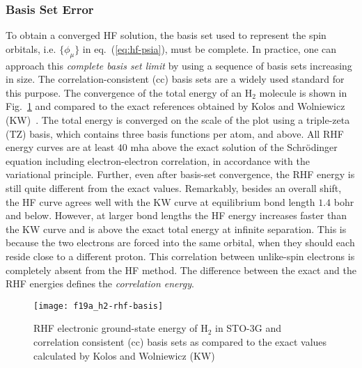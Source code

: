 \subsubsection{Basis Set Error}

To obtain a converged HF solution, the basis set used to represent the spin orbitals, i.e. $\{\phi_\mu\}$ in eq.~(\ref{eq:hf-psia}), must be complete.
In practice, one can approach this \textit{complete basis set limit} by using a sequence of basis sets increasing in size.
The correlation-consistent (cc) basis sets are a widely used standard for this purpose.
The convergence of the total energy of an H$_2$ molecule is shown in Fig.~\ref{fig:hf-h2} and compared to the exact references obtained by Kolos and Wolniewicz (KW)~\cite{Kolos1964}.
The total energy is converged on the scale of the plot using a triple-zeta (TZ) basis, which contains three basis functions per atom, and above.
All RHF energy curves are at least $40$ mha above the exact solution of the Schr\"odinger equation including electron-electron correlation, in accordance with the variational principle.
Further, even after basis-set convergence, the RHF energy is still quite different from the exact values.
Remarkably, besides an overall shift, the HF curve agrees well with the KW curve at equilibrium bond length $1.4$ bohr and below.
However, at larger bond lengths the HF energy increases faster than the KW curve and is above the exact total energy at infinite separation.
This is because the two electrons are forced into the same orbital, when they should each reside close to a different proton.
This correlation between unlike-spin electrons is completely absent from the HF method.
The difference between the exact and the RHF energies defines the \textit{correlation energy}.

\begin{figure}[h]
\centering
\texttt{[image: f19a\_h2-rhf-basis]}
\caption{RHF electronic ground-state energy of H$_2$ in STO-3G and correlation consistent (cc) basis sets as compared to the exact values calculated by Kolos and Wolniewicz (KW)~\cite{Kolos1964}}
\label{fig:hf-h2}
\end{figure}

